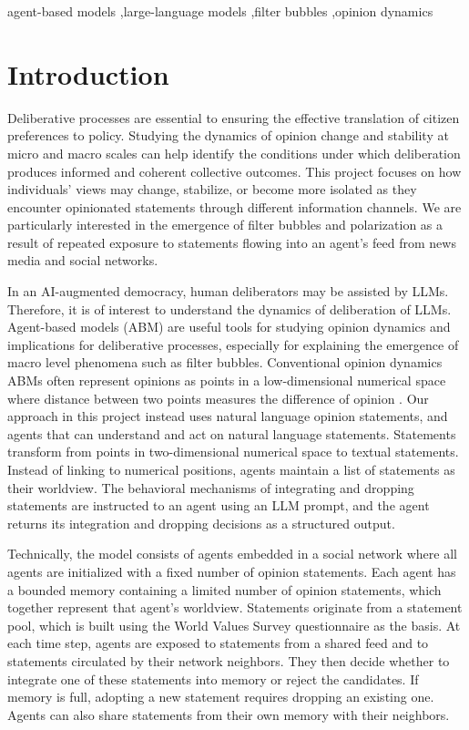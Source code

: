 \documentclass[]{ceurart}
\begin{document}
\begin{keywords}
agent-based models \sep large-language models \sep filter
bubbles \sep opinion dynamics
\end{keywords}

\maketitle

\section{Introduction}\label{introduction}

Deliberative processes are essential to ensuring the effective
translation of citizen preferences to policy. Studying the dynamics of
opinion change and stability at micro and macro scales can help identify
the conditions under which deliberation produces informed and coherent
collective outcomes. This project focuses on how individuals' views may
change, stabilize, or become more isolated as they encounter opinionated
statements through different information channels. We are particularly
interested in the emergence of filter bubbles and polarization as a
result of repeated exposure to statements flowing into an agent's feed
from news media and social networks.

In an AI-augmented democracy, human deliberators may be assisted by
LLMs. Therefore, it is of interest to understand the dynamics of
deliberation of LLMs. Agent-based models (ABM) are useful tools for
studying opinion dynamics and implications for deliberative processes,
especially for explaining the emergence of macro level phenomena such as
filter bubbles. Conventional opinion dynamics ABMs often represent
opinions as points in a low-dimensional numerical space where distance
between two points measures the difference of opinion
\citet{GeschkeEtAl2019TriplefilterBubbleUsing}. Our approach in this
project instead uses natural language opinion statements, and agents
that can understand and act on natural language statements. Statements
transform from points in two-dimensional numerical space to textual
statements. Instead of linking to numerical positions, agents maintain a
list of statements as their worldview. The behavioral mechanisms of
integrating and dropping statements are instructed to an agent using an
LLM prompt, and the agent returns its integration and dropping decisions
as a structured output.

Technically, the model consists of agents embedded in a social network
where all agents are initialized with a fixed number of opinion
statements. Each agent has a bounded memory containing a limited number
of opinion statements, which together represent that agent's worldview.
Statements originate from a statement pool, which is built using the
World Values Survey questionnaire as the basis. At each time step,
agents are exposed to statements from a shared feed and to statements
circulated by their network neighbors. They then decide whether to
integrate one of these statements into memory or reject the candidates.
If memory is full, adopting a new statement requires dropping an
existing one. Agents can also share statements from their own memory
with their neighbors.~
\end{document}
